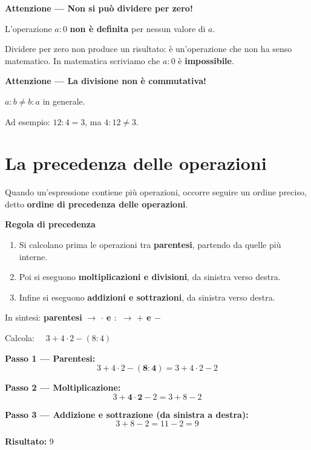 \begin{attenzione}
  \textbf{Attenzione — Non si può dividere per zero!}

  L'operazione $a : 0$ \textbf{non è definita} per nessun valore di $a$.

  \medskip
  Dividere per zero non produce un risultato: è un'operazione che non ha senso matematico. In matematica scriviamo che $a : 0$ è \textbf{impossibile}.
\end{attenzione}

\begin{attenzione}
  \textbf{Attenzione — La divisione non è commutativa!}

  $a : b \neq b : a$ in generale.

  \medskip
  Ad esempio: $12 : 4 = 3$, ma $4 : 12 \neq 3$.
\end{attenzione}

\section{La precedenza delle operazioni}

Quando un'espressione contiene più operazioni, occorre seguire un ordine preciso, detto \textbf{ordine di precedenza delle operazioni}.

\begin{regola}
  \textbf{Regola di precedenza}

  \begin{enumerate}
    \item Si calcolano prima le operazioni tra \textbf{parentesi}, partendo da quelle più interne.
    \item Poi si eseguono \textbf{moltiplicazioni e divisioni}, da sinistra verso destra.
    \item Infine si eseguono \textbf{addizioni e sottrazioni}, da sinistra verso destra.
  \end{enumerate}

  In sintesi: \textbf{parentesi} $\rightarrow$ \textbf{$\cdot$ e $:$} $\rightarrow$ \textbf{$+$ e $-$}
\end{regola}

\begin{esempio}
  Calcola: $\quad 3 + 4 \cdot 2 - (8 : 4)$

  \medskip
  \textbf{Passo 1 — Parentesi:}
  \[
    3 + 4 \cdot 2 - \mathbf{(8 : 4)} = 3 + 4 \cdot 2 - 2
  \]

  \textbf{Passo 2 — Moltiplicazione:}
  \[
    3 + \mathbf{4 \cdot 2} - 2 = 3 + 8 - 2
  \]

  \textbf{Passo 3 — Addizione e sottrazione (da sinistra a destra):}
  \[
    3 + 8 - 2 = 11 - 2 = 9
  \]

  \textbf{Risultato:} $9$
\end{esempio}

